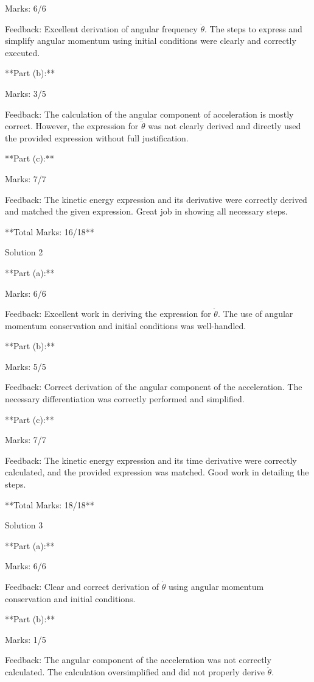 \documentclass[a4paper,11pt]{article}
\begin{document}
Marks: 6/6

Feedback: Excellent derivation of angular frequency \(\dot{\theta}\). The steps to express and simplify angular momentum using initial conditions were clearly and correctly executed.

**Part (b):**

Marks: 3/5

Feedback: The calculation of the angular component of acceleration is mostly correct. However, the expression for \(\ddot{\theta}\) was not clearly derived and directly used the provided expression without full justification.

**Part (c):**

Marks: 7/7

Feedback: The kinetic energy expression and its derivative were correctly derived and matched the given expression. Great job in showing all necessary steps.

**Total Marks: 16/18**

Solution 2

**Part (a):**

Marks: 6/6

Feedback: Excellent work in deriving the expression for \(\dot{\theta}\). The use of angular momentum conservation and initial conditions was well-handled.

**Part (b):**

Marks: 5/5

Feedback: Correct derivation of the angular component of the acceleration. The necessary differentiation was correctly performed and simplified.

**Part (c):**

Marks: 7/7

Feedback: The kinetic energy expression and its time derivative were correctly calculated, and the provided expression was matched. Good work in detailing the steps.

**Total Marks: 18/18**

Solution 3

**Part (a):**

Marks: 6/6

Feedback: Clear and correct derivation of \(\dot{\theta}\) using angular momentum conservation and initial conditions.

**Part (b):**

Marks: 1/5

Feedback: The angular component of the acceleration was not correctly calculated. The calculation oversimplified and did not properly derive \(\ddot{\theta}\).
\end{document}
